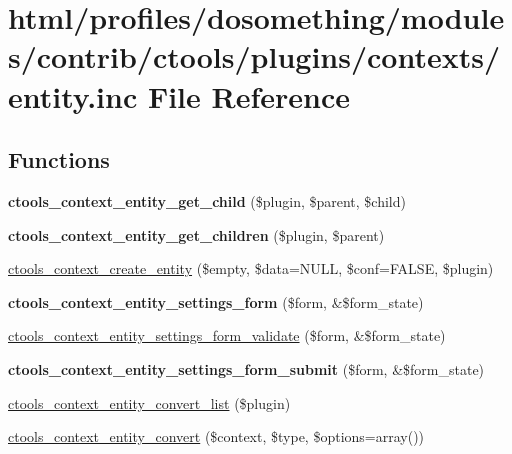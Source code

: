 \hypertarget{entity_8inc}{
\section{html/profiles/dosomething/modules/contrib/ctools/plugins/contexts/entity.inc File Reference}
\label{entity_8inc}
}
\subsection*{Functions}
\begin{DoxyCompactItemize}
\item 
\hypertarget{entity_8inc_a79a3c97a84fa740e5a9cf632fd934520}{
{\bfseries ctools\_\-context\_\-entity\_\-get\_\-child} (\$plugin, \$parent, \$child)}
\label{entity_8inc_a79a3c97a84fa740e5a9cf632fd934520}

\item 
\hypertarget{entity_8inc_a4a5518114498a64158ec4695fd793782}{
{\bfseries ctools\_\-context\_\-entity\_\-get\_\-children} (\$plugin, \$parent)}
\label{entity_8inc_a4a5518114498a64158ec4695fd793782}

\item 
\hyperlink{entity_8inc_af4533bf4379c92e7c7c244654fbff6db}{ctools\_\-context\_\-create\_\-entity} (\$empty, \$data=NULL, \$conf=FALSE, \$plugin)
\item 
\hypertarget{entity_8inc_af06c9cda03427a4260f1b851e8824cac}{
{\bfseries ctools\_\-context\_\-entity\_\-settings\_\-form} (\$form, \&\$form\_\-state)}
\label{entity_8inc_af06c9cda03427a4260f1b851e8824cac}

\item 
\hyperlink{entity_8inc_a65bdc35857e126643659af44b8b7cf04}{ctools\_\-context\_\-entity\_\-settings\_\-form\_\-validate} (\$form, \&\$form\_\-state)
\item 
\hypertarget{entity_8inc_a5b21d4dbb887a525b8d1e37b564c8925}{
{\bfseries ctools\_\-context\_\-entity\_\-settings\_\-form\_\-submit} (\$form, \&\$form\_\-state)}
\label{entity_8inc_a5b21d4dbb887a525b8d1e37b564c8925}

\item 
\hyperlink{entity_8inc_adddf0221dfebd051d7f9ac67d39ab61b}{ctools\_\-context\_\-entity\_\-convert\_\-list} (\$plugin)
\item 
\hyperlink{entity_8inc_a3b833ef59dcfa7155769ee6798c9221c}{ctools\_\-context\_\-entity\_\-convert} (\$context, \$type, \$options=array())
\end{DoxyCompactItemize}
